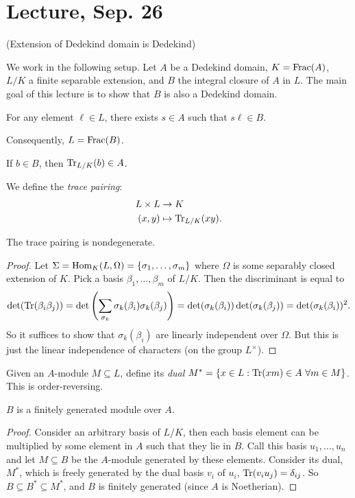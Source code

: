 \documentclass[11pt]{amsart}
\begin{document}
\section{Lecture, Sep. 26}

(Extension of Dedekind domain is Dedekind)

We work in the following setup. Let $A$ be a Dedekind domain, $K = \operatorname{Frac}(A)$, $L/K$ a finite separable extension, and $B$ the integral closure of $A$ in $L$. The main goal of this lecture is to show that $B$ is also a Dedekind domain.

\begin{prop}
For any element $\ell\in L$, there exists $s\in A$ such that $s\ell \in B$.
\end{prop}

Consequently, $L = \operatorname{Frac}(B)$.


\begin{prop}
If $b\in B$, then $\operatorname{Tr}_{L/K}(b) \in A$.
\end{prop}

We define the \emph{trace pairing}:
\begin{align*}
    L\times L &\to K \\
    (x,y) &\mapsto \operatorname{Tr}_{L/K}(xy).
\end{align*}

\begin{prop}
The trace pairing is nondegenerate.
\end{prop}

\begin{proof}
Let $\Sigma = \operatorname{Hom}_K(L, \Omega) = \{\sigma_1,\dots,\sigma_m\}$ where $\Omega$ is some separably closed extension of $K$.
Pick a basis $\beta_1,\dots,\beta_m$ of $L/K$. Then the discriminant is equal to
\[\det(\operatorname{Tr}(\beta_i\beta_j)) = \det\left( \sum_{\sigma_k} \sigma_k(\beta_i)\sigma_k(\beta_j) \right) = \det(\sigma_k(\beta_i))\det(\sigma_k(\beta_j)) = \det(\sigma_k(\beta_i))^2.\]
So it suffices to show that $\sigma_k(\beta_i)$ are linearly independent over $\Omega$. But this is just the linear independence of characters (on the group $L^{\times}$).
\end{proof}

Given an $A$-module $M\subseteq L$, define its \emph{dual} $M^* = \{x\in L: \operatorname{Tr}(xm) \in A\  \forall m\in M\}$. This is order-reversing.

\begin{prop}
$B$ is a finitely generated module over $A$.
\end{prop}

\begin{proof}
Consider an arbitrary basis of $L/K$, then each basis element can be multiplied by some element in $A$ such that they lie in $B$. Call this basis $u_1,\dots,u_n$ and let $M\subseteq B$ be the $A$-module generated by these elements. Consider its dual, $M^*$, which is freely generated by the dual basis $v_i$ of $u_i$, $\operatorname{Tr}(v_iu_j) = \delta_{ij}$. So $B \subseteq B^* \subseteq M^*$, and $B$ is finitely generated (since $A$ is Noetherian).
\end{proof}
\end{document}
